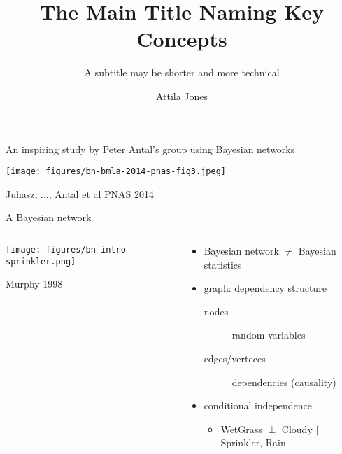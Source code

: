 \documentclass[aspectratio=169]{beamer}
\title{The Main Title Naming Key Concepts}
\subtitle{A subtitle may be shorter and more technical}
\author{Attila Jones}
\date{}
\begin{document}
\begin{frame}{An inspiring study by Peter Antal's group using Bayesian
  networks}
\begin{center}
\texttt{[image: figures/bn-bmla-2014-pnas-fig3.jpeg]}
\end{center}

\begin{center}
\tiny{Juhasz, ..., Antal et al PNAS 2014}
\end{center}
\end{frame}


\begin{frame}{A Bayesian network}
\begin{columns}[t]
\begin{column}{0.5\textwidth}

\texttt{[image: figures/bn-intro-sprinkler.png]}

\begin{center}
\tiny{Murphy 1998}
\end{center}
\end{column}

\begin{column}{0.5\textwidth}
\begin{itemize}
  \item Bayesian network \(\neq\) Bayesian statistics
  \item graph: dependency structure
  \begin{description}
    \item[nodes] random variables
    \item[edges/verteces] dependencies (causality)
  \end{description}
  \item conditional independence
  \begin{itemize}
    \item WetGrass \(\perp\) Cloudy \(|\) Sprinkler, Rain
  \end{itemize}
\end{itemize}

\end{column}
\end{columns}
\end{frame}
\end{document}
